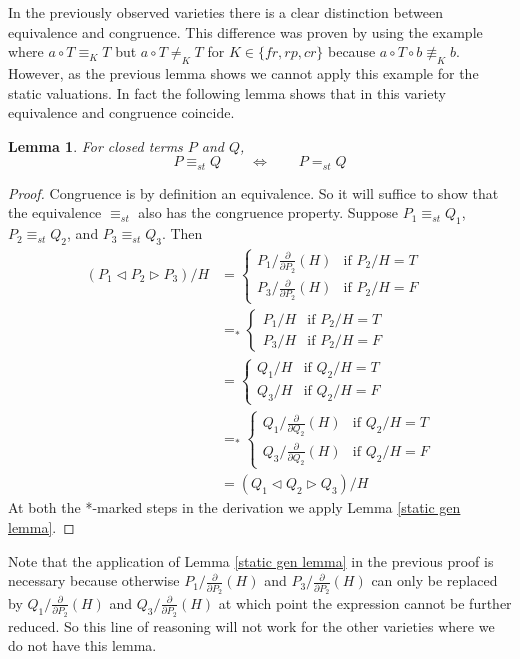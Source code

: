 \documentclass[a4paper,twoside,openright]{report}
\newcommand{\dd}[1]{\frac{\partial}{\partial #1}}
\newcommand{\lef}{\ensuremath{\triangleleft}}
\newcommand{\rig}{\ensuremath{\triangleright}}
\newtheorem{lem}[theorem]{Lemma}
\begin{document}
In the previously observed varieties there is a clear distinction between equivalence and congruence. This difference was proven by using the example where $a\circ T\equiv_KT$ but $a\circ T\ne_KT$ for $K\in\{fr,rp,cr\}$ because $a\circ T\circ b\not\equiv_Kb$. However, as the previous lemma shows we cannot apply this example for the static valuations. In fact the following lemma shows that in this variety equivalence and congruence coincide.
\begin{lem}\label{equiv congr lem}
For closed terms $P$ and $Q$,
\[
P\equiv_{st}Q\qquad\Longleftrightarrow\qquad P=_{st}Q
\]
\end{lem}
\begin{proof}
Congruence is by definition an equivalence. So it will suffice to show that the equivalence $\equiv_{st}$ also has the congruence property. Suppose $P_1\equiv_{st}Q_1$, $P_2\equiv_{st}Q_2$, and $P_3\equiv_{st}Q_3$. Then
\begin{align*}
(P_1\lef P_2\rig P_3)/H
&=\begin{cases}
P_1/\dd{P_2}(H) & \text{if $P_2/H=T$}\\
P_3/\dd{P_2}(H) & \text{if $P_2/H=F$}
\end{cases}\\
&=_*\begin{cases}
P_1/H & \text{if $P_2/H=T$}\\
P_3/H & \text{if $P_2/H=F$}
\end{cases}\\
&=\begin{cases}
Q_1/H & \text{if $Q_2/H=T$}\\
Q_3/H & \text{if $Q_2/H=F$}
\end{cases}\\
&=_*\begin{cases}
Q_1/\dd{Q_2}(H) & \text{if $Q_2/H=T$}\\
Q_3/\dd{Q_2}(H) & \text{if $Q_2/H=F$}
\end{cases}\\
&=(Q_1\lef Q_2\rig Q_3)/H
\end{align*}
At both the *-marked steps in the derivation we apply Lemma \ref{static gen lemma}.
\end{proof}
Note that the application of Lemma \ref{static gen lemma} in the previous proof is necessary because otherwise $P_1/\dd{P_2}(H)$ and $P_3/\dd {P_2}(H)$ can only be replaced by $Q_1/\dd {P_2}(H)$ and $Q_3/\dd{P_2}(H)$ at which point the expression cannot be further reduced. So this line of reasoning will not work for the other varieties where we do not have this lemma. 
\end{document}
